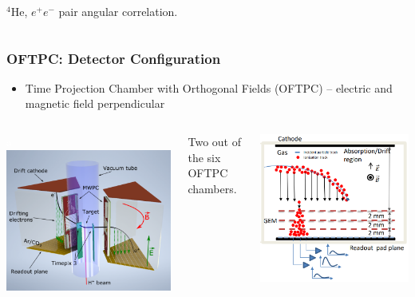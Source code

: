 \documentclass{beamer}
\begin{document}
\begin{frame}
\begin{itemize}
\begin{columns}
\begin{minipage}[t][4cm]{\textwidth}
					\end{minipage}
					\footnotesize{$ {}^4\text{He} $, $e^{+}e^{-}$ pair angular correlation.~\cite{atomki_he}}
			\end{columns}
		\end{itemize}
	\end{frame}
	\begin{frame}
		\frametitle{OFTPC: Detector Configuration}
		\begin{itemize}
			\item Time Projection Chamber with Orthogonal Fields (OFTPC) -- electric and magnetic field perpendicular
		\end{itemize}
		\begin{columns}
				\centering
				\begin{minipage}[t][4.05cm]{\textwidth}
					\centering
					\textcolor{white}{a\,\,}\includegraphics[width=0.82\linewidth]{../images/diagram.png}\newline
				\end{minipage}
				Two out of the six OFTPC chambers.~\cite{poster}
				\centering
				\begin{minipage}[t][4.05cm]{\textwidth}
					\centering
					\includegraphics[width=0.71\linewidth]{../images/diagram2.png}\newline

\end{minipage}
\end{columns}
\end{frame}
\end{document}
